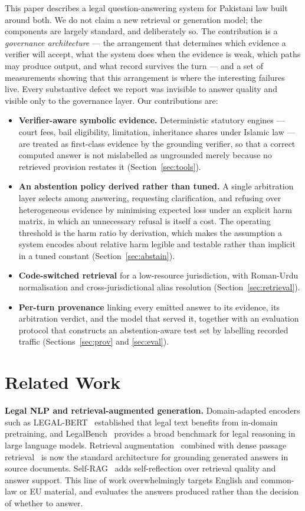 \documentclass[conference]{IEEEtran}
\begin{document}
This paper describes a legal question-answering system for Pakistani law built
around both. We do not claim a new retrieval or generation model; the components
are largely standard, and deliberately so. The contribution is a
\emph{governance architecture} --- the arrangement that determines which
evidence a verifier will accept, what the system does when the evidence is
weak, which paths may produce output, and what record survives the turn --- and
a set of measurements showing that this arrangement is where the interesting
failures live. Every substantive defect we report was invisible to answer
quality and visible only to the governance layer. Our contributions are:

\begin{itemize}
\item \textbf{Verifier-aware symbolic evidence.} Deterministic statutory
engines --- court fees, bail eligibility, limitation, inheritance shares under
Islamic law --- are treated as first-class evidence by the grounding verifier,
so that a correct computed answer is not mislabelled as ungrounded merely
because no retrieved provision restates it (Section~\ref{sec:tools}).
\item \textbf{An abstention policy derived rather than tuned.} A single
arbitration layer selects among answering, requesting clarification, and
refusing over heterogeneous evidence by minimising expected loss under an
explicit harm matrix, in which an unnecessary refusal is itself a cost. The
operating threshold is the harm ratio by derivation, which makes the assumption
a system encodes about relative harm legible and testable rather than implicit
in a tuned constant (Section~\ref{sec:abstain}).
\item \textbf{Code-switched retrieval} for a low-resource jurisdiction, with
Roman-Urdu normalisation and cross-jurisdictional alias resolution
(Section~\ref{sec:retrieval}).
\item \textbf{Per-turn provenance} linking every emitted answer to its evidence,
its arbitration verdict, and the model that served it, together with an
evaluation protocol that constructs an abstention-aware test set by labelling
recorded traffic (Sections~\ref{sec:prov} and \ref{sec:eval}).
\end{itemize}

\section{Related Work}
\textbf{Legal NLP and retrieval-augmented generation.}
Domain-adapted encoders such as LEGAL-BERT~\cite{chalkidis2020legalbert}
established that legal text benefits from in-domain pretraining, and
LegalBench~\cite{guha2023legalbench} provides a broad benchmark for legal
reasoning in large language models. Retrieval augmentation~\cite{lewis2020rag}
combined with dense passage retrieval~\cite{karpukhin2020dpr} is now the
standard architecture for grounding generated answers in source documents.
Self-RAG~\cite{asai2024selfrag} adds self-reflection over retrieval quality and
answer support. This line of work overwhelmingly targets English and
common-law or EU material, and evaluates the answers produced rather than the
decision of whether to answer.
\end{document}
